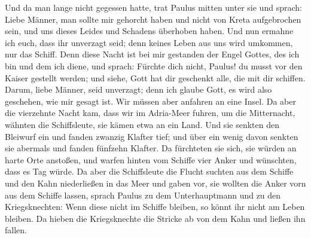  Und da man lange nicht gegessen hatte, trat Paulus
mitten unter sie und sprach: Liebe Männer, man sollte mir gehorcht haben
und nicht von Kreta aufgebrochen sein, und uns dieses Leides und
Schadens überhoben haben.  Und nun ermahne ich euch, dass
ihr unverzagt seid; denn keines Leben aus uns wird umkommen, nur das
Schiff.  Denn diese Nacht ist bei mir gestanden der Engel
Gottes, des ich bin und dem ich diene,  und sprach:
Fürchte dich nicht, Paulus! du musst vor den Kaiser gestellt werden; und
siehe, Gott hat dir geschenkt alle, die mit dir schiffen.
 Darum, liebe Männer, seid unverzagt; denn ich glaube
Gott, es wird also geschehen, wie mir gesagt ist.  Wir
müssen aber anfahren an eine Insel.  Da aber die
vierzehnte Nacht kam, dass wir im Adria-Meer fuhren, um die Mitternacht,
wähnten die Schiffsleute, sie kämen etwa an ein Land. 
Und sie senkten den Bleiwurf ein und fanden zwanzig Klafter tief; und
über ein wenig davon senkten sie abermals und fanden fünfzehn Klafter.
 Da fürchteten sie sich, sie würden an harte Orte
anstoßen, und warfen hinten vom Schiffe vier Anker und wünschten, dass
es Tag würde.  Da aber die Schiffsleute die Flucht
suchten aus dem Schiffe und den Kahn niederließen in das Meer und gaben
vor, sie wollten die Anker vorn aus dem Schiffe lassen, 
sprach Paulus zu dem Unterhauptmann und zu den Kriegsknechten: Wenn
diese nicht im Schiffe bleiben, so könnt ihr nicht am Leben bleiben.
 Da hieben die Kriegsknechte die Stricke ab von dem Kahn
und ließen ihn fallen.

